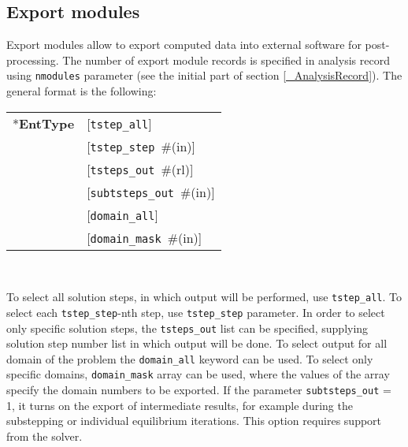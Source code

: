 \documentclass[a4paper]{article}
\newcommand{\param}[1]{\texttt{#1}} %
\newcommand{\optional}[1]{[#1]} %
\newcommand{\field}[2]{\param{#1}~\#{\tiny(#2)}} %
\newcommand{\optField}[2]{\optional{\field{#1}{#2}}}
\newcommand{\fieldnotype}[1]{\param{#1}}
\newcommand{\entKeyword}[1]{*\textbf{#1}} %
\newenvironment{record}[1][]{\begin{tabular}{|ll}}{\end{tabular}\\}
\newcommand{\recentry}[2]{{#1}&{#2}\\}
\newcounter{rcc}
\newenvironment{record}[1][\textwidth]{\setcounter{rcc}{0}\rowcolors{1}{lightgray}{lightgray}\tabularx{#1}{llR} \hline}
               {\endtabularx}
\newcommand{\recentry}[2]{\ifthenelse{\value{rcc}>0}{$\backslash$ \\}{\setcounter{rcc}{1}}{#1}&{#2}&}
\begin{document}
\subsection{Export modules}
\label{ExportModulesSec}
Export modules allow to export computed data into external software for
post-processing. The number of export module records is specified in
analysis record using \param{nmodules} parameter (see the initial part of section \ref{_AnalysisRecord}). The general format
is the following:\\
\begin{record}
  \recentry{\entKeyword{EntType}}{[\fieldnotype{tstep\_all}]}
  \recentry{}{\optField{tstep\_step}{in}}
  \recentry{}{\optField{tsteps\_out}{rl}}
  \recentry{}{\optField{subtsteps\_out}{in}}
  \recentry{}{[\fieldnotype{domain\_all}]}
  \recentry{}{\optField{domain\_mask}{in}}
\end{record}

To select all solution steps, in which output will be performed, use
\param{tstep\_all}. To select each \param{tstep\_step}-nth step, use
\param{tstep\_step} parameter. In order to select only specific
solution steps, the \param{tsteps\_out} list can be specified,
supplying solution step number list in which output will be done.
To select output for all domain of the problem the \param{domain\_all}
keyword can be used. To select only specific domains,
\param{domain\_mask} array can be used, where the values of the array
specify the domain numbers to be exported.
If the parameter \param{subtsteps\_out} = 1, it turns on the export of intermediate results, 
for example during the substepping or individual equilibrium iterations. This option requires support from the solver.
\end{document}

